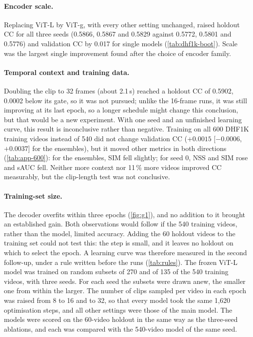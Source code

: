 \paragraph{Encoder scale.} Replacing \acrshort{ViT}-L by \acrshort{ViT}-g, with every other setting
unchanged, raised holdout \acrshort{CC} for all three seeds (0.5866, 0.5867 and 0.5829
against 0.5772, 0.5801 and 0.5776) and validation \acrshort{CC} by 0.017 for single models
(\cref{tab:dhf1k-boot}). Scale was the largest single improvement found after
the choice of encoder family.

\paragraph{Temporal context and training data.} Doubling the clip to 32 frames
(about 2.1\,s) reached a holdout \acrshort{CC} of 0.5902, 0.0002 below its gate, so it was
not pursued; unlike the 16-frame runs, it was still improving at its last
epoch, so a longer schedule might change this conclusion, but that would be a
new experiment. With one seed and an unfinished learning curve, this result is
inconclusive rather than negative. Training on all 600 DHF1K training videos
instead of 540 did not change validation \acrshort{CC} ($+0.0015$ [$-0.0006$, $+0.0037$]
for the ensembles), but it moved other metrics in both directions
(\cref{tab:app-600}): for the ensembles, \acrshort{SIM} fell slightly; for seed 0, \acrshort{NSS} and \acrshort{SIM}
rose and \acrshort{sAUC} fell. Neither more context nor 11\,\% more videos improved \acrshort{CC}
measurably, but the clip-length test was not conclusive.

\paragraph{Training-set size.}\label{sec:learning-curve} The decoder overfits
within three epochs (\cref{fig:g1}), and no addition to it brought an
established gain. Both observations would follow if the 540 training videos,
rather than the model, limited accuracy. Adding the 60 holdout videos to the
training set could not test this: the step is small, and it leaves no holdout
on which to select the epoch. A learning curve was therefore measured in the
second follow-up, under a rule written before the runs (\cref{tab:rules}). The
frozen \acrshort{ViT}-L model was
trained on random subsets of 270 and of 135 of the 540 training videos, with
three seeds. For each seed the subsets were drawn anew, the smaller one from
within the larger. The number of clips sampled per video in each epoch was
raised from 8 to 16 and to 32, so that every model took the same 1,620
optimisation steps, and all other settings were those of the main model. The
models were scored on the 60-video holdout in the same way as the three-seed
ablations, and each was compared with the 540-video model of the same seed.


